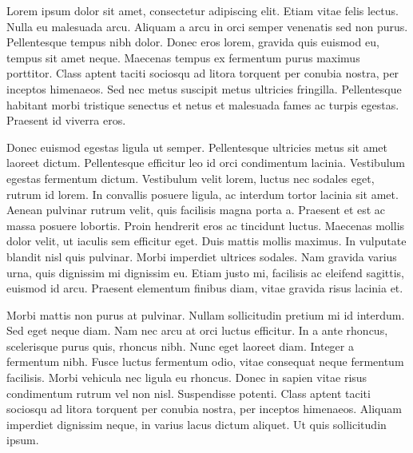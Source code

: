 \documentclass{lowell-prop}
\begin{document}

%

\justification

Lorem ipsum dolor sit amet, consectetur adipiscing elit. Etiam vitae felis lectus. Nulla eu malesuada arcu. Aliquam a arcu in orci semper venenatis sed non purus. Pellentesque tempus nibh dolor. Donec eros lorem, gravida quis euismod eu, tempus sit amet neque. Maecenas tempus ex fermentum purus maximus porttitor. Class aptent taciti sociosqu ad litora torquent per conubia nostra, per inceptos himenaeos. Sed nec metus suscipit metus ultricies fringilla. Pellentesque habitant morbi tristique senectus et netus et malesuada fames ac turpis egestas. Praesent id viverra eros.

Donec euismod egestas ligula ut semper. Pellentesque ultricies metus sit amet laoreet dictum. Pellentesque efficitur leo id orci condimentum lacinia. Vestibulum egestas fermentum dictum. Vestibulum velit lorem, luctus nec sodales eget, rutrum id lorem. In convallis posuere ligula, ac interdum tortor lacinia sit amet. Aenean pulvinar rutrum velit, quis facilisis magna porta a. Praesent et est ac massa posuere lobortis. Proin hendrerit eros ac tincidunt luctus. Maecenas mollis dolor velit, ut iaculis sem efficitur eget. Duis mattis mollis maximus. In vulputate blandit nisl quis pulvinar. Morbi imperdiet ultrices sodales. Nam gravida varius urna, quis dignissim mi dignissim eu. Etiam justo mi, facilisis ac eleifend sagittis, euismod id arcu. Praesent elementum finibus diam, vitae gravida risus lacinia et.

Morbi mattis non purus at pulvinar. Nullam sollicitudin pretium mi id interdum. Sed eget neque diam. Nam nec arcu at orci luctus efficitur. In a ante rhoncus, scelerisque purus quis, rhoncus nibh. Nunc eget laoreet diam. Integer a fermentum nibh. Fusce luctus fermentum odio, vitae consequat neque fermentum facilisis. Morbi vehicula nec ligula eu rhoncus. Donec in sapien vitae risus condimentum rutrum vel non nisl. Suspendisse potenti. Class aptent taciti sociosqu ad litora torquent per conubia nostra, per inceptos himenaeos. Aliquam imperdiet dignissim neque, in varius lacus dictum aliquet. Ut quis sollicitudin ipsum.
\end{document}
